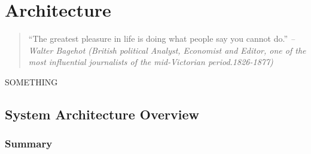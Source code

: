 \chapter{Architecture}\label{ch:architecture}

\begin{quotation}
“The greatest pleasure in life is doing what people say you cannot do.”
{\small\it -- Walter Bagehot (British political Analyst, Economist and Editor, one of the most influential journalists of the mid-Victorian period.1826-1877) }
\end{quotation}

SOMETHING


\section{System Architecture Overview}\label{architecture:overview}

\subsection*{Summary}
